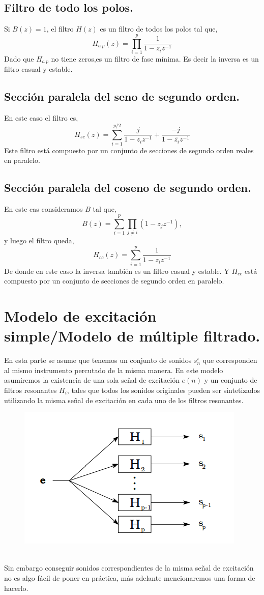 \documentclass[11pt]{amsart}
\theoremstyle{plain}
\theoremstyle{definition}
\begin{document}
\subsection{Filtro de todo los polos.}
Si $B(z)=1$, el filtro $H(z)$ es un filtro de todos los polos tal que,
$$
H_{a\ p} (z) = \prod_{i=1}^{p} \dfrac{1}{1-z_iz^{-1}}
$$
Dado que $H_{a \ p}$ no tiene zeros,es un filtro de fase mínima. Es decir la inversa es un filtro casual y estable.
\subsection{Sección paralela del seno de segundo orden.}
En este caso el filtro es,
$$
H_{sc}(z)=\sum_{i=1}^{p/2} \dfrac{j}{1-z_iz^{-1}}+\dfrac{-j}{1-\overline{z_i}z^{-1}}
$$
Este filtro está compuesto por un conjunto de secciones de segundo orden reales en paralelo.
\subsection{Sección paralela del coseno de segundo orden.}
En este cas  consideramos $B$ tal que,
$$
B(z) = \sum_{i=1}^p \prod_{j \neq i} (1-z_jz^{-1}),
$$
y luego el filtro queda,
$$
H_{cc}(z) = \sum_{i=1}^{p} \dfrac{1}{1-z_iz^{-1}}
$$
De donde en este caso la inversa también es un filtro casual y estable. Y $H_{cc}$ está compuesto por un conjunto de secciones de segundo orden en paralelo.
\section{Modelo de excitación simple/Modelo de múltiple filtrado.}
En esta parte se asume que tenemos un conjunto de sonidos $s_n^i$ que corresponden al mismo instrumento percutado de la misma manera.
En este modelo asumiremos la existencia de una sola señal de excitación $e(n)$ y un conjunto de filtros resonantes $H_i$, tales que todos los sonidos originales pueden ser sintetizados utilizando la misma señal de excitación en cada uno de los filtros resonantes. \\
\begin{figure}
\includegraphics[scale=1]{grafo1.png}
\end{figure}
\\
Sin embargo conseguir sonidos correspondientes de la misma señal de excitación no es algo fácil de poner en práctica, más adelante mencionaremos una forma de hacerlo. \\
\end{document}
